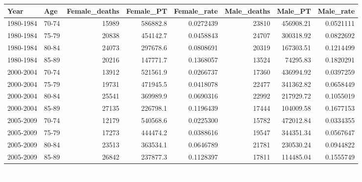\documentclass[landscape,twocolumn,letterpaper,9pt,reqno]{article}\usepackage[]{graphicx}\usepackage[]{color}
\newenvironment{knitrout}{}{} %
\begin{document}
\begin{knitrout}
\color{fgcolor}
\begin{tabular}{l|l|r|r|r|r|r|r}
\hline
Year & Age & Female\_deaths & Female\_PT & Female\_rate & Male\_deaths & Male\_PT & Male\_rate\\
\hline
1980-1984 & 70-74 & 15989 & 586882.8 & 0.0272439 & 23810 & 456908.21 & 0.0521111\\
\hline
1980-1984 & 75-79 & 20838 & 454142.7 & 0.0458843 & 24707 & 300318.92 & 0.0822692\\
\hline
1980-1984 & 80-84 & 24073 & 297678.6 & 0.0808691 & 20319 & 167303.51 & 0.1214499\\
\hline
1980-1984 & 85-89 & 20216 & 147771.7 & 0.1368057 & 13524 & 74295.83 & 0.1820291\\
\hline
2000-2004 & 70-74 & 13912 & 521561.9 & 0.0266737 & 17360 & 436994.92 & 0.0397259\\
\hline
2000-2004 & 75-79 & 19731 & 471945.5 & 0.0418078 & 22477 & 341362.82 & 0.0658449\\
\hline
2000-2004 & 80-84 & 25541 & 369989.9 & 0.0690316 & 22992 & 217929.72 & 0.1055019\\
\hline
2000-2004 & 85-89 & 27135 & 226798.1 & 0.1196439 & 17444 & 104009.58 & 0.1677153\\
\hline
2005-2009 & 70-74 & 12179 & 540568.6 & 0.0225300 & 15782 & 472012.84 & 0.0334355\\
\hline
2005-2009 & 75-79 & 17273 & 444474.2 & 0.0388616 & 19547 & 344351.34 & 0.0567647\\
\hline
2005-2009 & 80-84 & 23513 & 363534.1 & 0.0646789 & 21781 & 230530.24 & 0.0944822\\
\hline
2005-2009 & 85-89 & 26842 & 237877.3 & 0.1128397 & 17811 & 114485.04 & 0.1555749\\
\hline
\end{tabular}


\end{knitrout}

\textcolor{white}{text}\newline
\end{document}
